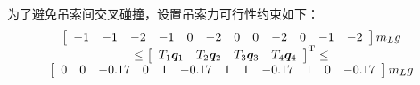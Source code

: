 为了避免吊索间交叉碰撞，设置吊索力可行性约束如下：
\begin{equation}
    \begin{array}{c}
        \left[ \begin{array}{*{20}{c}}
            - 1 & - 1 & - 2 & - 1 & 0 & -2 & 0 & 0 & - 2 & 0 &- 1 & - 2\\\end{array} 
            \right]{m_L}g \\
            \le \left[\begin{array}{*{20}{c}}
                T_1\boldsymbol{q}_1 & T_2\boldsymbol{q}_2 & T_3\boldsymbol{q}_3 & T_4\boldsymbol{q}_4
            \end{array}\right]^{\rm{T}} \le\\
        \left[ \begin{array}{*{20}{c}}
            0 & 0 & - 0.17 & 0 & 1 & -0.17& 1 & 1 & -0.17 & 1 & 0 & -0.17\\\end{array} 
            \right]{m_L}g \\       
    \end{array}
\end{equation}


